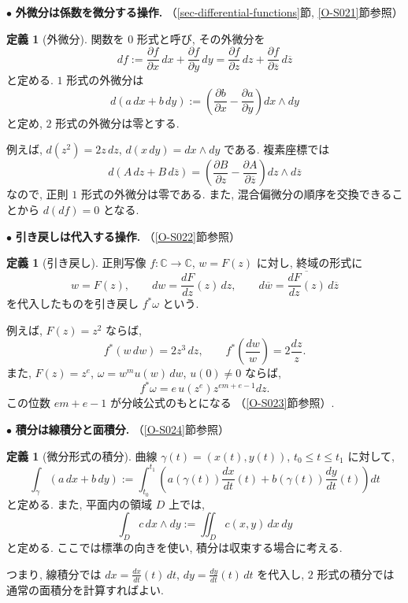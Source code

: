 \documentclass[dvipdfmx,a4paper,11pt]{article} %
\newcommand{\C}{\mathbb{C}}
\theoremstyle{definition}
\numberwithin{equation}{section}
\newtheorem{dfn}[thm]{定義}
\begin{document}
\medskip
\noindent
$\bullet$ \textbf{外微分は係数を微分する操作.}
（\ref{sec-differential-functions}節, \ref{O-S021}節参照）

\begin{dfn}[外微分]
関数を $0$ 形式と呼び, その外微分を
\[
df:=\frac{\partial f}{\partial x}\,dx
+\frac{\partial f}{\partial y}\,dy
=\frac{\partial f}{\partial z}\,dz
+\frac{\partial f}{\partial\overline z}\,d\overline z
\]
と定める.
$1$ 形式の外微分は
\[
d(a\,dx+b\,dy)
:=\left(
\frac{\partial b}{\partial x}-\frac{\partial a}{\partial y}
\right)dx\wedge dy
\]
と定め, $2$ 形式の外微分は零とする.
\end{dfn}

例えば, $d(z^2)=2z\,dz$, $d(x\,dy)=dx\wedge dy$ である.
複素座標では
\[
d(A\,dz+B\,d\overline z)
=\left(
\frac{\partial B}{\partial z}
-\frac{\partial A}{\partial\overline z}
\right)dz\wedge d\overline z
\]
なので, 正則 $1$ 形式の外微分は零である.
また, 混合偏微分の順序を交換できることから $d(df)=0$ となる.

\medskip
\noindent
$\bullet$ \textbf{引き戻しは代入する操作.}
（\ref{O-S022}節参照）

\begin{dfn}[引き戻し]
正則写像 $f:\C\to\C$, $w=F(z)$ に対し,
終域の形式に
\[
w=F(z),\qquad
dw=\frac{dF}{dz}(z)\,dz,\qquad
d\overline w=\overline{\frac{dF}{dz}(z)}\,d\overline z
\]
を代入したものを引き戻し $f^*\omega$ という.
\end{dfn}

例えば, $F(z)=z^2$ ならば,
\[
f^*(w\,dw)=2z^3\,dz,\qquad
f^*\left(\frac{dw}{w}\right)=2\frac{dz}{z}.
\]
また, $F(z)=z^e$, $\omega=w^m u(w)\,dw$, $u(0)\neq0$ ならば,
\[
f^*\omega=e\,u(z^e)z^{em+e-1}dz.
\]
この位数 $em+e-1$ が分岐公式のもとになる
（\ref{O-S023}節参照）.

\medskip
\noindent
$\bullet$ \textbf{積分は線積分と面積分.}
（\ref{O-S024}節参照）

\begin{dfn}[微分形式の積分]
曲線 $\gamma(t)=(x(t),y(t))$, $t_0\leq t\leq t_1$ に対して,
\[
\int_\gamma(a\,dx+b\,dy)
:=\int_{t_0}^{t_1}
\left(
a(\gamma(t))\frac{dx}{dt}(t)
+b(\gamma(t))\frac{dy}{dt}(t)
\right)dt
\]
と定める.
また, 平面内の領域 $D$ 上では,
\[
\int_D c\,dx\wedge dy:=\iint_D c(x,y)\,dx\,dy
\]
と定める.
ここでは標準の向きを使い, 積分は収束する場合に考える.
\end{dfn}

つまり, 線積分では
$dx=\frac{dx}{dt}(t)\,dt$,
$dy=\frac{dy}{dt}(t)\,dt$ を代入し,
$2$ 形式の積分では通常の面積分を計算すればよい.
\end{document}
